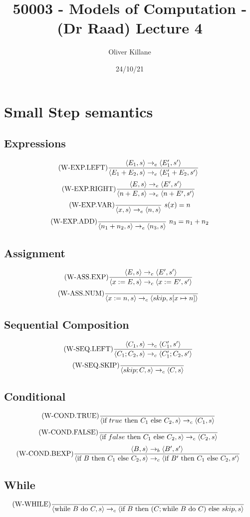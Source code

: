 \documentclass{report}
\title{50003 - Models of Computation - (Dr Raad) Lecture 4}
\author{Oliver Killane}
\date{24/10/21}
\begin{document}
\maketitle
{}

\section*{Small Step semantics}
\subsection*{Expressions}
\[\text{(W-EXP.LEFT)}\dfrac{
		\langle E_1, s \rangle \to_e \langle E_1', s' \rangle
	}{\langle E_1 + E_2, s \rangle \to_e \langle E_1' + E_2, s' \rangle} \ \]
\[\text{(W-EXP.RIGHT)}\dfrac{
		\langle E, s \rangle \to_e \langle E', s' \rangle
	}{\langle n + E, s \rangle \to_e \langle n + E', s' \rangle} \ \]
\[\text{(W-EXP.VAR)}\dfrac{}{\langle x, s \rangle \to_e \langle n, s \rangle} \ s(x) = n\]
\[\text{(W-EXP.ADD)}\dfrac{}{\langle n_1 + n_2, s \rangle \to_e \langle n_3, s \rangle} \ n_3 = n_1 + n_2\]
\subsection*{Assignment}
\[\text{(W-ASS.EXP)}\dfrac{\langle E, s \rangle \to_e \langle E', s' \rangle}{
		\langle x := E, s \rangle \to_c \langle x := E', s' \rangle
	} \ \]
\[\text{(W-ASS.NUM)}\dfrac{}{
		\langle x:= n, s \rangle \to_c \langle skip, s[x \mapsto n] \rangle
	} \ \]
\subsection*{Sequential Composition}
\[\text{(W-SEQ.LEFT)}\dfrac{\langle C_1, s \rangle \to_c \langle C_1', s' \rangle}{
		\langle C_1;C_2, s \rangle \to_c \langle C_1';C_2, s' \rangle
	} \ \]
\[\text{(W-SEQ.SKIP)}\dfrac{}{
		\langle skip;C, s \rangle \to_c \langle C, s \rangle
	} \ \]
\subsection*{Conditional}
\[\text{(W-COND.TRUE)}\dfrac{}{\langle \text{if } true \text{ then } C_1 \text{ else } C_2, s \rangle \to_c \langle C_1, s \rangle} \ \]
\[\text{(W-COND.FALSE)}\dfrac{}{\langle \text{if } false \text{ then } C_1 \text{ else } C_2, s \rangle \to_c \langle C_2, s \rangle} \ \]
\[\text{(W-COND.BEXP)}\dfrac{
		\langle B, s \rangle \to_b \langle B', s' \rangle
	}{\langle \text{if } B \text{ then } C_1 \text{ else } C_2, s \rangle \to_c \langle \text{if } B' \text{ then } C_1 \text{ else } C_2, s' \rangle} \ \]
\subsection*{While}
\[\text{(W-WHILE)}\dfrac{}{
		\langle \text{while } B \text{ do } C, s \rangle \to_c \langle \text{if } B \text{ then } (C; \text{while } B \text{ do } C) \text{ else } skip, s \rangle
	} \ \]
\end{document}
